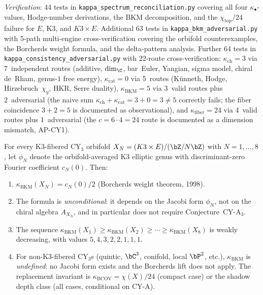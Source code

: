 \noindent\textit{Verification}: 44 tests in \texttt{kappa\_spectrum\_reconciliation.py} covering all four $\kappa_\bullet$-values, Hodge-number derivations, the BKM decomposition, and the $\chi_{\mathrm{top}}/24$ failure for $E$, K3, and $K3 \times E$.  Additional 63 tests in \texttt{kappa\_bkm\_adversarial.py} with 5-path multi-engine cross-verification covering the orbifold counterexamples, the Borcherds weight formula, and the delta-pattern analysis.  Further 64 tests in \texttt{kappa\_consistency\_adversarial.py} with 22-route cross-verification: $\kappa_{\mathrm{ch}} = 3$ via 7~independent routes (additive, $\dim_\C$, bar~Euler, Yangian, sigma model, chiral de~Rham, genus-$1$ free energy), $\kappa_{\mathrm{cat}} = 0$ via 5~routes (K\"unneth, Hodge, Hirzebruch~$\chi_y$, HKR, Serre duality), $\kappa_{\mathrm{BKM}} = 5$ via 3~valid routes plus 2~adversarial (the naive sum $\kappa_{\mathrm{ch}} + \kappa_{\mathrm{cat}} = 3 + 0 = 3 \neq 5$ correctly fails; the fiber coincidence $3 + 2 = 5$ is documented as observational), and $\kappa_{\mathrm{fiber}} = 24$ via 4~valid routes plus 1~adversarial (the $c = 6 \cdot 4 = 24$ route is documented as a dimension mismatch, AP-CY1).

\begin{proposition}
\label{prop:bkm-weight-universal}
\ClaimStatusProvedHere
For every K3-fibered CY$_3$ orbifold $X_N = (K3 \times E)/(\bZ/N\bZ)$ with $N = 1, \ldots, 8$, let $\phi_N$ denote the orbifold-averaged K3 elliptic genus with discriminant-zero Fourier coefficient $c_N(0)$.  Then:
\begin{enumerate}[label=\textup{(\roman*)}]
  \item $\kappa_{\mathrm{BKM}}(X_N) = c_N(0)/2$ \textup{(}Borcherds weight theorem, 1998\textup{)}.
  \item The formula is \emph{unconditional}: it depends on the Jacobi form $\phi_N$, not on the chiral algebra $A_{X_N}$, and in particular does not require Conjecture~CY-A$_3$.
  \item The sequence $\kappa_{\mathrm{BKM}}(X_1) \ge \kappa_{\mathrm{BKM}}(X_2) \ge \cdots \ge \kappa_{\mathrm{BKM}}(X_8)$ is weakly decreasing, with values $5, 4, 3, 2, 2, 1, 1, 1$.
  \item For non-K3-fibered CY$_3$s \textup{(}quintic, $\bC^3$, conifold, local $\bP^2$, etc.\textup{)}, $\kappa_{\mathrm{BKM}}$ is \emph{undefined}: no Jacobi form exists and the Borcherds lift does not apply.  The replacement invariant is $\kappa_{\mathrm{BCOV}} = \chi(X)/24$ \textup{(}compact case\textup{)} or the shadow depth class \textup{(}all cases, conditional on CY-A\textup{)}.
\end{enumerate}
\end{proposition}

